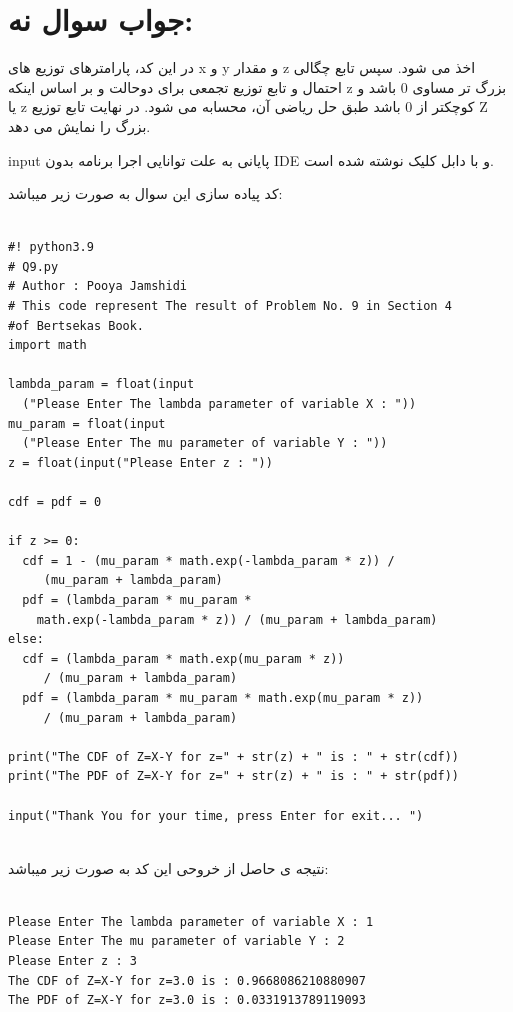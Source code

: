 \documentclass[a4paper,14pt]{article}
\begin{document}
\section*{جواب سوال نه:}
در این کد، پارامترهای توزیع های x و y و مقدار z اخذ می شود. سپس تابع چگالی احتمال و تابع توزیع تجمعی برای دوحالت و بر اساس اینکه z بزرگ تر مساوی 0 باشد و یا z کوچکتر از 0 باشد طبق حل ریاضی آن، محسابه می شود. در نهایت تابع توزیع Z بزرگ را نمایش می دهد.

\noindent input
پایانی به علت توانایی اجرا برنامه بدون IDE و با دابل کلیک نوشته شده است.

کد پیاده  سازی این سوال به صورت زیر میباشد:\\

\fontsize{12}{12}\selectfont
\begin{latin}
	\begin{lstlisting}
		
#! python3.9
# Q9.py
# Author : Pooya Jamshidi
# This code represent The result of Problem No. 9 in Section 4 
#of Bertsekas Book.
import math

lambda_param = float(input
  ("Please Enter The lambda parameter of variable X : "))
mu_param = float(input
  ("Please Enter The mu parameter of variable Y : "))
z = float(input("Please Enter z : "))

cdf = pdf = 0

if z >= 0:
  cdf = 1 - (mu_param * math.exp(-lambda_param * z)) /
     (mu_param + lambda_param)
  pdf = (lambda_param * mu_param * 
    math.exp(-lambda_param * z)) / (mu_param + lambda_param)
else:
  cdf = (lambda_param * math.exp(mu_param * z))
     / (mu_param + lambda_param)
  pdf = (lambda_param * mu_param * math.exp(mu_param * z))
     / (mu_param + lambda_param)

print("The CDF of Z=X-Y for z=" + str(z) + " is : " + str(cdf))
print("The PDF of Z=X-Y for z=" + str(z) + " is : " + str(pdf))

input("Thank You for your time, press Enter for exit... ")
		
	\end{lstlisting}
\end{latin}
\fontsize{14}{14}\selectfont

نتیجه ی حاصل از خروحی این کد به صورت زیر میباشد:\\


\fontsize{12}{12}\selectfont
\begin{latin}
	\begin{lstlisting}
		
Please Enter The lambda parameter of variable X : 1
Please Enter The mu parameter of variable Y : 2
Please Enter z : 3
The CDF of Z=X-Y for z=3.0 is : 0.9668086210880907
The PDF of Z=X-Y for z=3.0 is : 0.0331913789119093
		
	\end{lstlisting}
\end{latin}
\fontsize{14}{14}\selectfont
\end{document}
